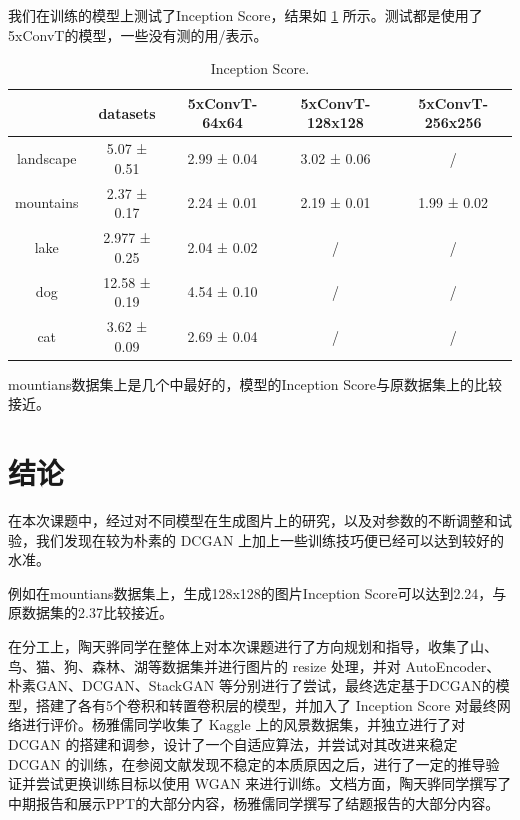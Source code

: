 \documentclass{article}
\begin{document}
\begin{CJK*}{UTF8}{gbsn}
  	我们在训练的模型上测试了Inception Score，结果如 \ref{table_score} 所示。测试都是使用了5xConvT的模型，一些没有测的用/表示。

	\begin{table}[!h]
   		\label{table_score}
   		\begin{center}
   			\begin{tabular}{|c|c|c|c|c|}
   				\hline
 				          & datasets & 5xConvT-64x64 & 5xConvT-128x128 &5xConvT-256x256\\
				\hline
   				landscape & 5.07 ± 0.51 & 2.99 ± 0.04 & 3.02 ± 0.06& / \\
   				\hline
   				mountains & 2.37 ± 0.17 & 2.24 ± 0.01 & 2.19 ± 0.01 & 1.99 ± 0.02\\
				\hline
				lake & 2.977 ± 0.25 & 2.04 ± 0.02 & / & /\\
				\hline
				dog & 12.58 ± 0.19 & 4.54 ± 0.10 & / & /\\
				\hline
				cat & 3.62 ± 0.09 & 2.69 ± 0.04 & / & /\\
   				\hline
   			\end{tabular}
   			\vspace{10pt}
   			\caption{Inception Score.}
   		\end{center}
   	\end{table}

	mountians数据集上是几个中最好的，模型的Inception Score与原数据集上的比较接近。

\section{结论}

在本次课题中，经过对不同模型在生成图片上的研究，以及对参数的不断调整和试验，我们发现在较为朴素的 DCGAN 上加上一些训练技巧便已经可以达到较好的水准。

例如在mountians数据集上，生成128x128的图片Inception Score可以达到2.24，与原数据集的2.37比较接近。

  在分工上，陶天骅同学在整体上对本次课题进行了方向规划和指导，收集了山、鸟、猫、狗、森林、湖等数据集并进行图片的 resize 处理，并对 AutoEncoder、朴素GAN、DCGAN、StackGAN 等分别进行了尝试，最终选定基于DCGAN的模型，搭建了各有5个卷积和转置卷积层的模型，并加入了 Inception Score 对最终网络进行评价。杨雅儒同学收集了 Kaggle 上的风景数据集，并独立进行了对 DCGAN 的搭建和调参，设计了一个自适应算法，并尝试对其改进来稳定 DCGAN 的训练，在参阅文献发现不稳定的本质原因之后，进行了一定的推导验证并尝试更换训练目标以使用 WGAN 来进行训练。文档方面，陶天骅同学撰写了中期报告和展示PPT的大部分内容，杨雅儒同学撰写了结题报告的大部分内容。


\end{CJK*}
\end{document}
